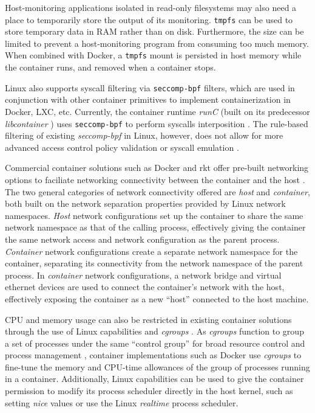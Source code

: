 \documentclass{proc}
\begin{document}
Host-monitoring applications isolated in read-only filesystems may also need a place to temporarily store the output of its monitoring. \texttt{tmpfs} can be used to store temporary data in RAM rather than on disk. Furthermore, the size can be limited to prevent a host-monitoring program from consuming too much memory. When combined with Docker, a \texttt{tmpfs} mount is persisted in host memory while the container runs, and removed when a container stops.

Linux also supports syscall filtering via \texttt{seccomp-bpf} filters, which are used in conjunction with other container primitives to implement containerization in Docker, LXC, etc. Currently, the container runtime \textit{runC} (built on its predecessor \textit{libcontainer} \cite{hykes2014libcontainer}) uses \texttt{seccomp-bpf} to perform syscalls interposition \cite{opencontainerinitiative}. The rule-based filtering of existing \textit{seccomp-bpf} in Linux, however, does not allow for more advanced access control policy validation or syscall emulation \cite{seccompuserspace}.

Commercial container solutions such as Docker and rkt offer pre-built networking options to faciliate networking connectivity between the container and the host \cite{dockernetworking, rktnetworking}. The two general categories of network connectivity offered are \textit{host} and \textit{container}, both built on the network separation properties provided by Linux network namespaces. \textit{Host} network configurations set up the container to share the same network namespace as that of the calling process, effectively giving the container the same network access and network configuration as the parent process. \textit{Container} network configurations create a separate network namespace for the container, separating its connectivity from the network namespace of the parent process. In \textit{container} network configurations, a network bridge and virtual ethernet devices are used to connect the container's network with the host, effectively exposing the container as a new ``host'' connected to the host machine.

CPU and memory usage can also be restricted in existing container solutions through the use of Linux capabilities and \textit{cgroups} \cite{dockerconstraints}. As \textit{cgroups} function to group a set of processes under the same ``control group'' for broad resource control and process management \cite{menagecgroups}, container implementations such as Docker use \textit{cgroups} to fine-tune the memory and CPU-time allowances of the group of processes running in a container. Additionally, Linux capabilities can be used to give the container permission to modify its process scheduler directly in the host kernel, such as setting \textit{nice} values or use the Linux \textit{realtime} process scheduler.
\end{document}
